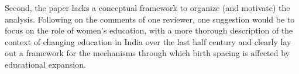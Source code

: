 Second, the paper lacks a conceptual framework to organize (and motivate) the analysis. Following on the comments of one reviewer, one suggestion would be to focus on the role of women’s education, with a more thorough description of the context of changing education in India over the last half century and clearly lay out a framework for the mechanisms through which birth spacing is affected by educational expansion.


